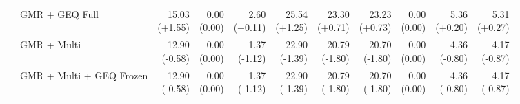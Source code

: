 \documentclass{article}
\begin{document}
{\begin{tabular}{llrrrrrrrrr}
 & GMR + GEQ Full & \shortstack{15.03 \\ {\scriptsize\textcolor{Gain}{(+1.55)}}} & \shortstack{0.00 \\ {\scriptsize\textcolor{Zero}{(0.00)}}} & \shortstack{2.60 \\ {\scriptsize\textcolor{Gain}{(+0.11)}}} & \shortstack{25.54 \\ {\scriptsize\textcolor{Gain}{(+1.25)}}} & \shortstack{23.30 \\ {\scriptsize\textcolor{Gain}{(+0.71)}}} & \shortstack{23.23 \\ {\scriptsize\textcolor{Gain}{(+0.73)}}} & \shortstack{0.00 \\ {\scriptsize\textcolor{Zero}{(0.00)}}} & \shortstack{5.36 \\ {\scriptsize\textcolor{Gain}{(+0.20)}}} & \shortstack{5.31 \\ {\scriptsize\textcolor{Gain}{(+0.27)}}} \\
 & GMR + Multi & \shortstack{12.90 \\ {\scriptsize\textcolor{Loss}{(-0.58)}}} & \shortstack{0.00 \\ {\scriptsize\textcolor{Zero}{(0.00)}}} & \shortstack{1.37 \\ {\scriptsize\textcolor{Loss}{(-1.12)}}} & \shortstack{22.90 \\ {\scriptsize\textcolor{Loss}{(-1.39)}}} & \shortstack{20.79 \\ {\scriptsize\textcolor{Loss}{(-1.80)}}} & \shortstack{20.70 \\ {\scriptsize\textcolor{Loss}{(-1.80)}}} & \shortstack{0.00 \\ {\scriptsize\textcolor{Zero}{(0.00)}}} & \shortstack{4.36 \\ {\scriptsize\textcolor{Loss}{(-0.80)}}} & \shortstack{4.17 \\ {\scriptsize\textcolor{Loss}{(-0.87)}}} \\
 & GMR + Multi + GEQ Frozen & \shortstack{12.90 \\ {\scriptsize\textcolor{Loss}{(-0.58)}}} & \shortstack{0.00 \\ {\scriptsize\textcolor{Zero}{(0.00)}}} & \shortstack{1.37 \\ {\scriptsize\textcolor{Loss}{(-1.12)}}} & \shortstack{22.90 \\ {\scriptsize\textcolor{Loss}{(-1.39)}}} & \shortstack{20.79 \\ {\scriptsize\textcolor{Loss}{(-1.80)}}} & \shortstack{20.70 \\ {\scriptsize\textcolor{Loss}{(-1.80)}}} & \shortstack{0.00 \\ {\scriptsize\textcolor{Zero}{(0.00)}}} & \shortstack{4.36 \\ {\scriptsize\textcolor{Loss}{(-0.80)}}} & \shortstack{4.17 \\ {\scriptsize\textcolor{Loss}{(-0.87)}}} \\

\end{tabular}}
\end{document}
